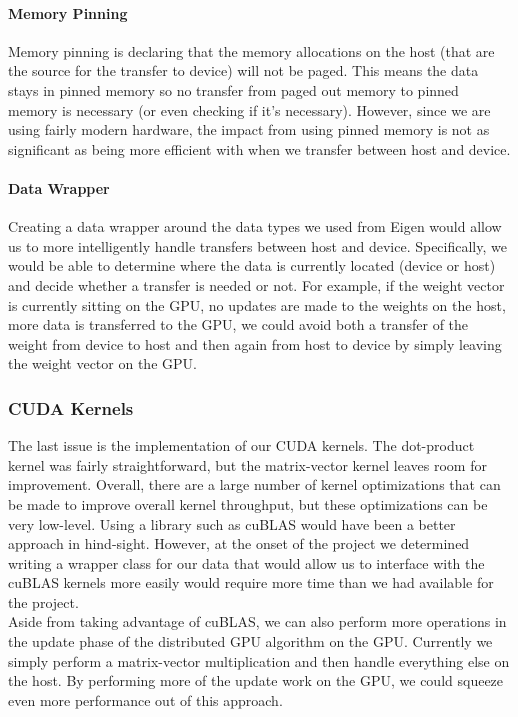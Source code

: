 \documentclass{article}
\begin{document}
\paragraph{Memory Pinning} Memory pinning is declaring that the memory
allocations on the host (that are the source for the transfer to device) will
not be paged. This means the data stays in pinned memory so no transfer from
paged out memory to pinned memory is necessary (or even checking if it's
necessary). However, since we are using fairly modern hardware, the impact from
using pinned memory is not as significant as being more efficient with when we
transfer between host and device.

\paragraph{Data Wrapper} Creating a data wrapper around the data types we used
from Eigen would allow us to more intelligently handle transfers between host
and device. Specifically, we would be able to determine where the data is
currently located (device or host) and decide whether a transfer is needed or
not. For example, if the weight vector is currently sitting on the GPU, no
updates are made to the weights on the host, more data is transferred to the
GPU, we could avoid both a transfer of the weight from device to host and then
again from host to device by simply leaving the weight vector on the GPU.

\subsubsection{CUDA Kernels}
The last issue is the implementation of our CUDA kernels. The dot-product
kernel was fairly straightforward, but the matrix-vector kernel leaves room for
improvement. Overall, there are a large number of kernel optimizations that can
be made to improve overall kernel throughput, but these optimizations can be
very low-level. Using a library such as cuBLAS would have been a better
approach in hind-sight. However, at the onset of the project we determined
writing a wrapper class for our data that would allow us to interface with the
cuBLAS kernels more easily would require more time than we had available for
the project.\\

Aside from taking advantage of cuBLAS, we can also perform more operations in
the update phase of the distributed GPU algorithm on the GPU. Currently we
simply perform a matrix-vector multiplication and then handle everything else on
the host. By performing more of the update work on the GPU, we could squeeze
even more performance out of this approach.
\end{document}
